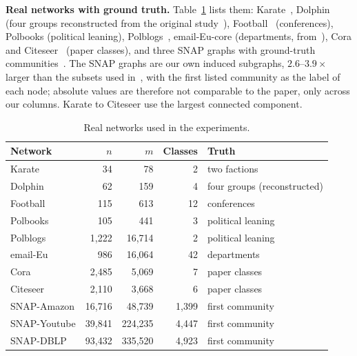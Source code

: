 \documentclass[conference]{IEEEtran}
\begin{document}
\textbf{Real networks with ground truth.} Table~\ref{tab:data} lists them: Karate~\cite{zachary1977}, Dolphin (four groups reconstructed from the original study~\cite{lusseau2003}), Football~\cite{girvan2002} (conferences), Polbooks (political leaning), Polblogs~\cite{adamic2005}, email-Eu-core (departments, from~\cite{yin2017}), Cora and Citeseer~\cite{sen2008} (paper classes), and three SNAP graphs with ground-truth communities~\cite{yang2012}. The SNAP graphs are our own induced subgraphs, $2.6$--$3.9\times$ larger than the subsets used in~\cite{kong2026}, with the first listed community as the label of each node; absolute values are therefore not comparable to the paper, only across our columns. Karate to Citeseer use the largest connected component.
\begin{table}[!htb]
\centering
\caption{Real networks used in the experiments.}
\label{tab:data}
\scriptsize
\begin{tabular}{lrrr>{\raggedright\arraybackslash}p{23mm}}
\toprule
Network & $n$ & $m$ & Classes & Truth \\
\midrule
Karate & 34 & 78 & 2 & two factions \\
Dolphin & 62 & 159 & 4 & four groups (reconstructed) \\
Football & 115 & 613 & 12 & conferences \\
Polbooks & 105 & 441 & 3 & political leaning \\
Polblogs & 1{,}222 & 16{,}714 & 2 & political leaning \\
email-Eu & 986 & 16{,}064 & 42 & departments \\
Cora & 2{,}485 & 5{,}069 & 7 & paper classes \\
Citeseer & 2{,}110 & 3{,}668 & 6 & paper classes \\
SNAP-Amazon & 16{,}716 & 48{,}739 & 1{,}399 & first community \\
SNAP-Youtube & 39{,}841 & 224{,}235 & 4{,}447 & first community \\
SNAP-DBLP & 93{,}432 & 335{,}520 & 4{,}923 & first community \\
\bottomrule
\end{tabular}
\end{table}
\end{document}

